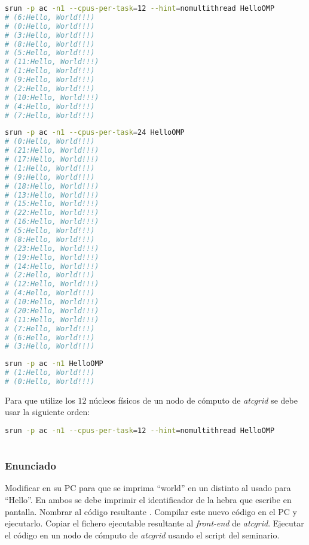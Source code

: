 \begin{lstlisting}[language=sh]
srun -p ac -n1 --cpus-per-task=12 --hint=nomultithread HelloOMP
# (6:Hello, World!!!)
# (0:Hello, World!!!)
# (3:Hello, World!!!)
# (8:Hello, World!!!)
# (5:Hello, World!!!)
# (11:Hello, World!!!)
# (1:Hello, World!!!)
# (9:Hello, World!!!)
# (2:Hello, World!!!)
# (10:Hello, World!!!)
# (4:Hello, World!!!)
# (7:Hello, World!!!)
\end{lstlisting}

\pagebreak

\begin{lstlisting}[language=sh]
srun -p ac -n1 --cpus-per-task=24 HelloOMP
# (0:Hello, World!!!)
# (21:Hello, World!!!)
# (17:Hello, World!!!)
# (1:Hello, World!!!)
# (9:Hello, World!!!)
# (18:Hello, World!!!)
# (13:Hello, World!!!)
# (15:Hello, World!!!)
# (22:Hello, World!!!)
# (16:Hello, World!!!)
# (5:Hello, World!!!)
# (8:Hello, World!!!)
# (23:Hello, World!!!)
# (19:Hello, World!!!)
# (14:Hello, World!!!)
# (2:Hello, World!!!)
# (12:Hello, World!!!)
# (4:Hello, World!!!)
# (10:Hello, World!!!)
# (20:Hello, World!!!)
# (11:Hello, World!!!)
# (7:Hello, World!!!)
# (6:Hello, World!!!)
# (3:Hello, World!!!)
\end{lstlisting}

\begin{lstlisting}[language=sh]
srun -p ac -n1 HelloOMP
# (1:Hello, World!!!)
# (0:Hello, World!!!)
\end{lstlisting}

Para que  utilize los $12$ núcleos físicos de un nodo de cómputo de \textit{atcgrid} se debe usar la siguiente orden:

\begin{lstlisting}[language=sh]
srun -p ac -n1 --cpus-per-task=12 --hint=nomultithread HelloOMP
\end{lstlisting}

\section{}\label{ej1-4}

\subsubsection{Enunciado}

Modificar en su PC  para que se imprima ``world'' en un  distinto al usado para ``Hello''.
En ambos  se debe imprimir el identificador de la hebra que escribe en pantalla.
Nombrar al código resultante .
Compilar este nuevo código en el PC y ejecutarlo.
Copiar el fichero ejecutable resultante al \textit{front-end} de \textit{atcgrid}.
Ejecutar el código en un nodo de cómputo de \textit{atcgrid} usando el script  del seminario.

